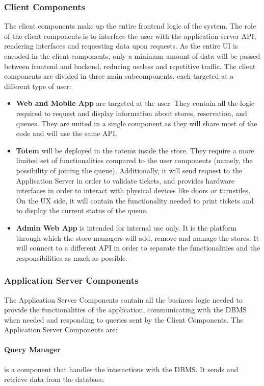 \subsubsection{Client Components}
The client components make up the entire frontend logic of the system.
The role of the client components is to interface the user with the application server API, rendering interfaces and requesting data upon requests. As the entire UI is encoded in the client components, only a minimum amount of data will be passed between frontend and backend, reducing useless and repetitive traffic.
The client components are divided in three main subcomponents, each targeted at a different type of user:
\begin{itemize}
    \item \textbf{Web and Mobile App} are targeted at the user. They contain all the logic required to request and display information about stores, reservation, and queues. They are united in a single component as they will share most of the code and will use the same API.
    \item \textbf{Totem} will be deployed in the totems inside the store. They require a more limited set of functionalities compared to the user components (namely, the possibility of joining the queue). Additionally, it will send request to the Application Server in order to validate tickets, and provides hardware interfaces in order to interact with physical devices like doors or turnstiles. On the UX side, it will contain the functionality needed to print tickets and to display the current status of the queue.
    \item \textbf{Admin Web App} is intended for internal use only. It is the platform through which the store managers will add, remove and manage the stores. It will connect to a different API in order to separate the functionalities and the responsibilities as much as possible.
\end{itemize}


\subsubsection{Application Server Components}
The Application Server Components contain all the business logic needed to provide the functionalities of the application, communicating with the DBMS when needed and responding to queries sent by the Client Components.
The Application Server Components are:

\paragraph{Query Manager} is a component that handles the interactions with the DBMS. It sends and retrieve data from the database.

